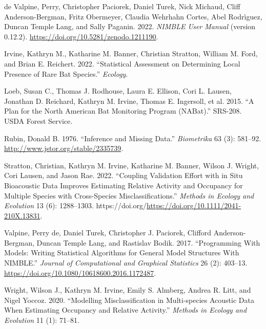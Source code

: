 \documentclass[
]{article}
\newlength{\cslhangindent}
\newlength{\cslentryspacingunit} %
\newenvironment{CSLReferences}[2] %
 {%
  \setlength{\parindent}{0pt}
  \ifodd #1
  \let\oldpar\par
  \def\par{\hangindent=\cslhangindent\oldpar}
  \fi
  \setlength{\parskip}{#2\cslentryspacingunit}
 }%
 {}
\begin{document}
\hypertarget{refs}{}
\begin{CSLReferences}{1}{0}
\leavevmode{}%
de Valpine, Perry, Christopher Paciorek, Daniel Turek, Nick Michaud, Cliff Anderson-Bergman, Fritz Obermeyer, Claudia Wehrhahn Cortes, Abel Rodrìguez, Duncan Temple Lang, and Sally Paganin. 2022. \emph{{NIMBLE} User Manual} (version 0.12.2). \url{https://doi.org/10.5281/zenodo.1211190}.

\leavevmode{}%
Irvine, Kathryn M., Katharine M. Banner, Christian Stratton, William M. Ford, and Brian E. Reichert. 2022. {``Statistical Assessment on Determining Local Presence of Rare Bat Species.''} \emph{Ecology}.

\leavevmode{}%
Loeb, Susan C., Thomas J. Rodhouse, Laura E. Ellison, Cori L. Lausen, Jonathan D. Reichard, Kathryn M. Irvine, Thomas E. Ingersoll, et al. 2015. {``A Plan for the {N}orth {A}merican Bat Monitoring Program ({NAB}at).''} SRS-208. USDA Forest Service.

\leavevmode{}%
Rubin, Donald B. 1976. {``Inference and Missing Data.''} \emph{Biometrika} 63 (3): 581--92. \url{http://www.jstor.org/stable/2335739}.

\leavevmode{}%
Stratton, Christian, Kathryn M. Irvine, Katharine M. Banner, Wilson J. Wright, Cori Lausen, and Jason Rae. 2022. {``Coupling Validation Effort with in Situ Bioacoustic Data Improves Estimating Relative Activity and Occupancy for Multiple Species with Cross-Species Misclassifications.''} \emph{Methods in Ecology and Evolution} 13 (6): 1288--1303. https://doi.org/\url{https://doi.org/10.1111/2041-210X.13831}.

\leavevmode{}%
Valpine, Perry de, Daniel Turek, Christopher J. Paciorek, Clifford Anderson-Bergman, Duncan Temple Lang, and Rastislav Bodik. 2017. {``Programming {W}ith {M}odels: {W}riting {S}tatistical {A}lgorithms for {G}eneral {M}odel {S}tructures {W}ith {NIMBLE}.''} \emph{Journal of {C}omputational and {G}raphical {S}tatistics} 26 (2): 403--13. \url{https://doi.org/10.1080/10618600.2016.1172487}.

\leavevmode{}%
Wright, Wilson J., Kathryn M. Irvine, Emily S. Almberg, Andrea R. Litt, and Nigel Yoccoz. 2020. {``Modelling Misclassification in Multi‐species Acoustic Data When Estimating Occupancy and Relative Activity.''} \emph{Methods in Ecology and Evolution} 11 (1): 71--81.

\end{CSLReferences}
\end{document}

